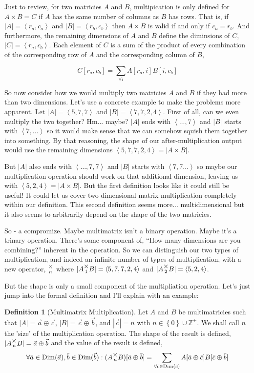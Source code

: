 \documentclass[12pt]{article}
\theoremstyle{definition}
\newtheorem{definition}{Definition}[section]
\theoremstyle{case}
\theoremstyle{ppart}
\DeclareMathOperator{\Dim}{Dim}
\newcommand{\mmult}[1]{\text{\raisebox{1ex}{$\underset{#1}{\times}$}}}
\begin{document}
Just to review, for two matricies $A$ and $B$, multipication is only defined
for $A \times B = C$ if $A$ has the same number of columns as $B$ has rows.
That is, if $|A| = \left< r_a, c_a \right>$ and $|B| = \left< r_b, c_b \right>$
then $A \times B$ is valid if and only if $c_a = r_b$. And furthermore,
the remaining dimensions of $A$ and $B$ define the diminsions of $C$,
$|C| = \left< r_a, c_b \right>$. Each element of $C$ is a sum of the product of
every combination of the corresponding row of $A$ and the corresponding column of
$B$,

\[ C[r_a, c_b] = \sum_{\forall i} A[r_a, i] B[i, c_b] \]

So now consider how we would multiply two matricies $A$ and $B$ if they had more
than two dimensions. Let's use a concrete example to make the problems more apparent.
Let $|A| = \left<5,7,7\right>$ and $|B| = \left<7,7,2,4\right>$.
First of all, can we even multiply the two together? Hm... maybe? $|A|$ ends with
$\left<\ldots, 7\right>$ and $|B|$ starts with $\left<7,\ldots\right>$ so it would
make sense that we can somehow squish them together into something. By that reasoning,
the shape of our after-multiplication output would use the remaining dimensions
$\left<5, 7, 7, 2, 4\right> = |A \times B|$.

But $|A|$ also ends with $\left<\ldots, 7, 7\right>$ and $|B|$ starts with
$\left<7, 7\ldots\right>$ so maybe our multiplication operation should work on that
additional dimension, leaving us with $\left<5, 2, 4\right> = |A \times B|$.
But the first definition looks like it could still be useful! It could let us cover 
two dimensional matrix multiplication completely within our definition. This second
definition seems more... multidimensional but it also seems to arbitrarily depend
on the shape of the two matricies.

So - a compromize. Maybe multimatrix isn't a binary operation. Maybe it's a trinary
operation. There's some component of, ``How many dimensions are you combining?'' inherent
in the operation. So we can distinguish our two types of multiplication, and indeed
an infinite number of types of multiplication, with a new operator, $\mmult{n}$ where
$|A \mmult{1} B| = \left<5, 7, 7, 2, 4\right>$ and 
$|A \mmult{2} B| = \left<5, 2, 4\right>$.

But the shape is only a small component of the multipliation  operation. Let's
just jump into the formal definition and I'll explain with an example:

\begin{definition}[Multimatrix Multiplication]
\label{mm_mult}
Let $A$ and $B$ be multimatricies such that $|A| = \vec{a} \oplus \vec{c}$,
$|B| = \vec{c} \oplus \vec{b}$, and $|\vec{c}| = n$ with
$n \in \left\{ 0 \right\} \cup \mathbb{Z}^{+}$. We shall call $n$ the 'size'
of the multiplication operation.
The shape of the result is defined, $|A \mmult{n} B| = \vec{a} \oplus \vec{b}$
and the value of the result is defined,
\[
\forall \bar{a} \in \Dim(\vec{a}), \bar{b} \in \Dim(\vec{b}):
(A \mmult{n}  B)[\bar{a} \oplus \bar{b}] =
\sum_{\forall \bar{c} \in \Dim(\vec{c})}
  A[\bar{a} \oplus \bar{c}] B[\bar{c} \oplus \bar{b}]
\]
\end{definition}
\end{document}
